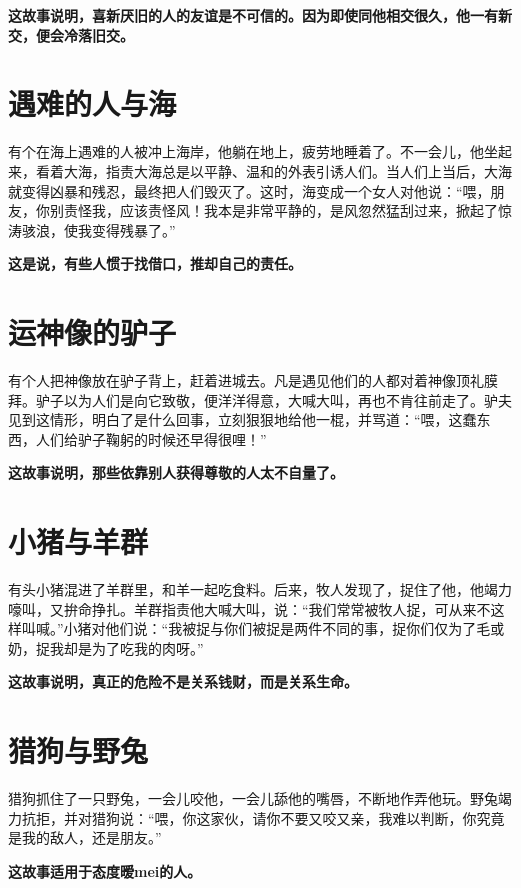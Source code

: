 {\bfseries \color{red}这故事说明，喜新厌旧的人的友谊是不可信的。因为即使同他相交很久，他一有新交，便会冷落旧交。}

\section{遇难的人与海}

有个在海上遇难的人被冲上海岸，他躺在地上，疲劳地睡着了。不一会儿，他坐起来，看着大海，指责大海总是以平静、温和的外表引诱人们。当人们上当后，大海就变得凶暴和残忍，最终把人们毁灭了。这时，海变成一个女人对他说：“喂，朋友，你别责怪我，应该责怪风！我本是非常平静的，是风忽然猛刮过来，掀起了惊涛骇浪，使我变得残暴了。”

{\bfseries \color{red}这是说，有些人惯于找借口，推却自己的责任。}

\section{运神像的驴子}

有个人把神像放在驴子背上，赶着进城去。凡是遇见他们的人都对着神像顶礼膜拜。驴子以为人们是向它致敬，便洋洋得意，大喊大叫，再也不肯往前走了。驴夫见到这情形，明白了是什么回事，立刻狠狠地给他一棍，并骂道：“喂，这蠢东西，人们给驴子鞠躬的时候还早得很哩！”

{\bfseries \color{red}这故事说明，那些依靠别人获得尊敬的人太不自量了。}

\section{小猪与羊群}

有头小猪混进了羊群里，和羊一起吃食料。后来，牧人发现了，捉住了他，他竭力嚎叫，又拚命挣扎。羊群指责他大喊大叫，说：“我们常常被牧人捉，可从来不这样叫喊。”小猪对他们说：“我被捉与你们被捉是两件不同的事，捉你们仅为了毛或奶，捉我却是为了吃我的肉呀。”

{\bfseries \color{red}这故事说明，真正的危险不是关系钱财，而是关系生命。}

\section{猎狗与野兔}

猎狗抓住了一只野兔，一会儿咬他，一会儿舔他的嘴唇，不断地作弄他玩。野兔竭力抗拒，并对猎狗说：“喂，你这家伙，请你不要又咬又亲，我难以判断，你究竟是我的敌人，还是朋友。”

{\bfseries \color{red}这故事适用于态度暧mei的人。}

